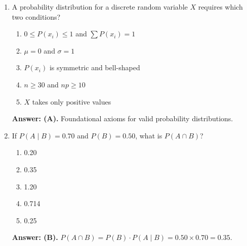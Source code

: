 \begin{enumerate}[leftmargin=1.5em]
  \item A probability distribution for a discrete random variable $X$ requires which two conditions?
  \begin{enumerate}[label=(\Alph*)]
    \item $0 \le P(x_i) \le 1$ and $\sum P(x_i) = 1$
    \item $\mu = 0$ and $\sigma = 1$
    \item $P(x_i)$ is symmetric and bell-shaped
    \item $n \ge 30$ and $np \ge 10$
    \item $X$ takes only positive values
  \end{enumerate}
  \textbf{Answer: (A).} Foundational axioms for valid probability distributions.

  \item If $P(A \mid B) = 0.70$ and $P(B) = 0.50$, what is $P(A \cap B)$?
  \begin{enumerate}[label=(\Alph*)]
    \item 0.20 \item 0.35 \item 1.20 \item 0.714 \item 0.25
  \end{enumerate}
  \textbf{Answer: (B).} $P(A \cap B) = P(B) \cdot P(A \mid B) = 0.50 \times 0.70 = 0.35$.
\end{enumerate}


